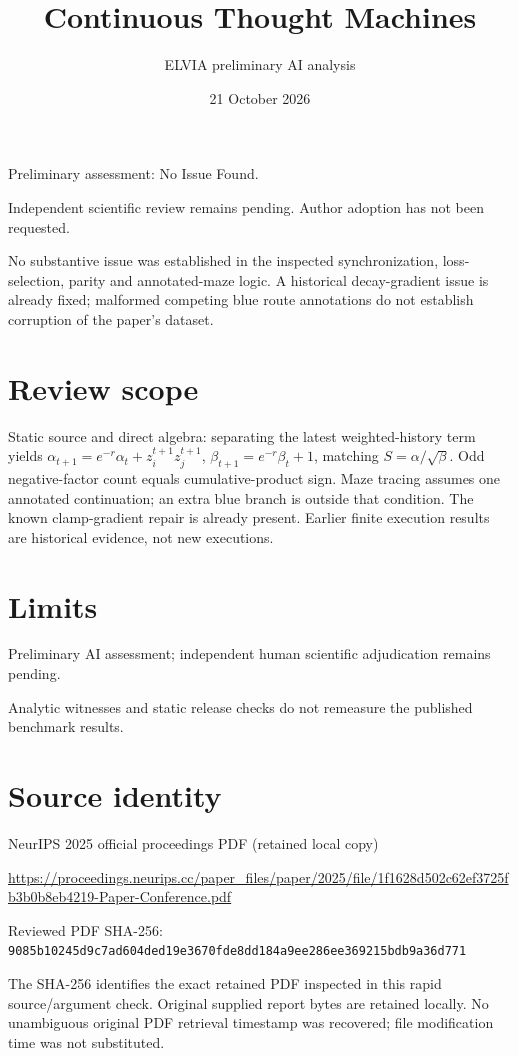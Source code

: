 \documentclass[11pt]{article}
\begin{document}
\title{Continuous Thought Machines}

\author{ELVIA preliminary AI analysis}\date{21 October 2026}\maketitle

Preliminary assessment: No Issue Found.\par

Independent scientific review remains pending. Author adoption has not been requested.

No substantive issue was established in the inspected synchronization, loss-selection, parity and annotated-maze logic. A historical decay-gradient issue is already fixed; malformed competing blue route annotations do not establish corruption of the paper’s dataset.

\section*{Review scope}

Static source and direct algebra: separating the latest weighted-history term yields \(\alpha_{t+1}=e^{-r}\alpha_t+z_i^{t+1}z_j^{t+1}\), \(\beta_{t+1}=e^{-r}\beta_t+1\), matching \(S=\alpha/\sqrt\beta\). Odd negative-factor count equals cumulative-product sign. Maze tracing assumes one annotated continuation; an extra blue branch is outside that condition. The known clamp-gradient repair is already present. Earlier finite execution results are historical evidence, not new executions.

\section*{Limits}

Preliminary AI assessment; independent human scientific adjudication remains pending.\par

Analytic witnesses and static release checks do not remeasure the published benchmark results.\par

\section*{Source identity}

NeurIPS 2025 official proceedings PDF (retained local copy)

\url{https://proceedings.neurips.cc/paper_files/paper/2025/file/1f1628d502c62ef3725fb3b0b8eb4219-Paper-Conference.pdf}

Reviewed PDF SHA-256: \nolinkurl{9085b10245d9c7ad604ded19e3670fde8dd184a9ee286ee369215bdb9a36d771}

The SHA-256 identifies the exact retained PDF inspected in this rapid source/argument check. Original supplied report bytes are retained locally. No unambiguous original PDF retrieval timestamp was recovered; file modification time was not substituted.
\end{document}
